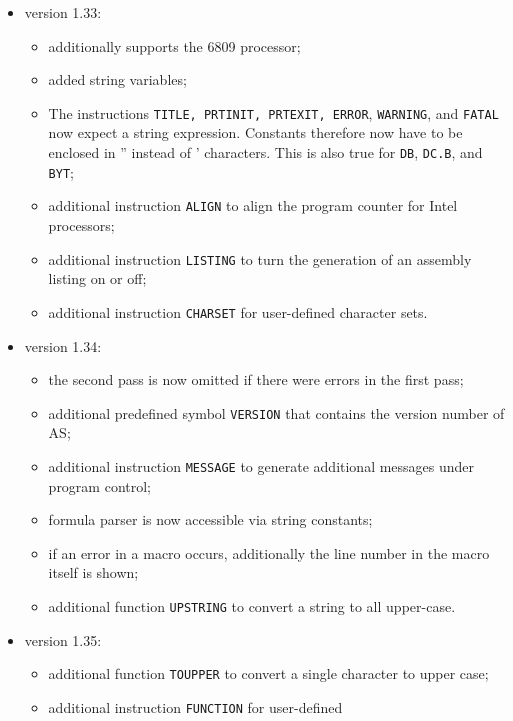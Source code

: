 \documentclass[12pt,twoside]{report}
\newcommand{\tty}[1]{{\tt #1}}
\begin{document}
\begin{itemize}
{\begin{itemize}
      \end{itemize}}
\item{version 1.33:
      \begin{itemize}
      \item{additionally supports the 6809 processor;}
      \item{added string variables;}
      \item{The instructions \tty{TITLE, PRTINIT, PRTEXIT, ERROR},
            \tty{WARNING}, and \tty{FATAL} now expect a string expression.
            Constants therefore now have to be enclosed in
            '' instead of ' characters.  This is also true
            for \tty{DB}, \tty{DC.B}, and \tty{BYT};}
      \item{additional instruction \tty{ALIGN} to align the program
            counter for Intel processors;}
      \item{additional instruction \tty{LISTING} to turn the generation
            of an assembly listing on or off;}
      \item{additional instruction \tty{CHARSET} for user-defined
            character sets.}
      \end{itemize}}
\item{version 1.34:
      \begin{itemize}
      \item{the second pass is now omitted if there were errors
            in the first pass;}
      \item{additional predefined symbol \tty{VERSION} that contains
            the version number of AS;}
      \item{additional instruction \tty{MESSAGE} to generate additional
            messages under program control;}
      \item{formula parser is now accessible via string constants;}
      \item{if an error in a macro occurs, additionally the line
            number in the macro itself is shown;}
      \item{additional function \tty{UPSTRING} to convert a string to
            all upper-case.}
      \end{itemize}}
\item{version 1.35:
      \begin{itemize}
      \item{additional function \tty{TOUPPER} to convert a single
            character to upper case;}
      \item{additional instruction \tty{FUNCTION} for user-defined
}
\end{itemize}}
\end{itemize}
\end{document}
